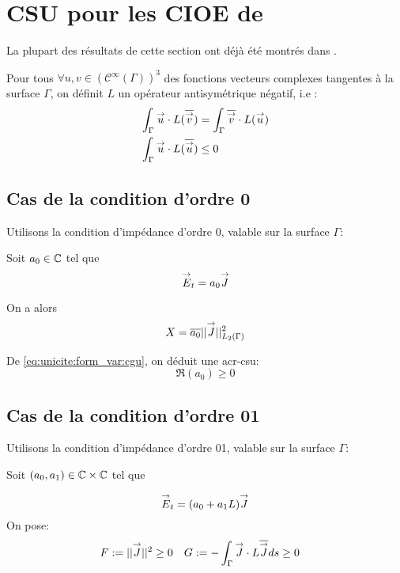 \section{CSU pour les CIOE de \cite{stupfel_sufficient_2011}}
  La plupart des résultats de cette section ont déjà été montrés dans \cite{stupfel_sufficient_2011}.


  Pour tous \(\forall u, v \in (\mathcal C^\infty(\Gamma))^3\) des fonctions vecteurs complexes tangentes à la surface \(\Gamma\), on définit \(L\) un opérateur antisymétrique négatif, i.e :
  \begin{align*}
    \int_\Gamma {\overset{\rightarrow}{u}}\cdot L({\overline{{\overset{\rightarrow}{v}}}}) &= \int_\Gamma {\overline{{\overset{\rightarrow}{v}}}}\cdot L({\overset{\rightarrow}{u}})\\
    \int_\Gamma {\overset{\rightarrow}{u}}\cdot L({\overline{{\overset{\rightarrow}{u}}}}) &\le 0
  \end{align*}

  \subsection{Cas de la condition d'ordre 0}
    Utilisons la condition d’impédance d'ordre 0, valable sur la surface \(\Gamma\):

    Soit \(a_0 \in \mathbb C\) tel que
    \[
      {\overset{\rightarrow}{E}}_t = a_0 {\overset{\rightarrow}{J}}
    \]

    On a alors
    \begin{equation*}
    X = {\overline{a_0}}||{\overset{\rightarrow}{J}}||_{L_2(\Gamma)}^2
    \end{equation*}

    De \eqref{eq:unicite:form_var:cgu}, on déduit une \gls{acr-csu}:
    \begin{equation}
    \Re\left(a_0\right) \ge 0
    \end{equation}

  \subsection{Cas de la condition d'ordre 01}
    Utilisons la condition d’impédance d'ordre 01, valable sur la surface \(\Gamma\):

    Soit \((a_0, a_1) \in \mathbb C\times\mathbb C\) tel que

    \[
      {\overset{\rightarrow}{E}}_t = (a_0 +a_1L){\overset{\rightarrow}{J}}
    \]
    On pose:
    \begin{align*}
      F&:= || {\overset{\rightarrow}{J}}|| ^2 \ge 0  & G&:= -\int_\Gamma {\overset{\rightarrow}{J}}\cdot L{\overline{{\overset{\rightarrow}{J}}}} ds \ge 0
    \end{align*}

